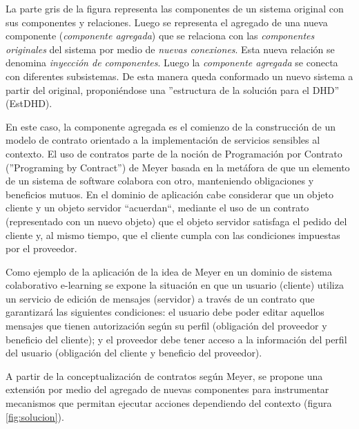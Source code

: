 La parte gris de la figura representa las componentes de un sistema original
con sus componentes y relaciones. Luego se representa el agregado de una nueva
componente (\textit{componente agregada}) que se relaciona con las
\textit{componentes originales} del sistema por medio de \textit{nuevas
conexiones}. Esta nueva relación se denomina \textit{inyección de componentes}.
Luego la \textit{componente agregada} se conecta con diferentes subsistemas. De
esta manera queda conformado un nuevo sistema a partir del
original, proponiéndose una ''estructura de la solución para
el DHD” (EstDHD).

En este caso, la componente agregada es el comienzo de la
construcción de un modelo de contrato orientado a la implementación de servicios
sensibles al contexto. El uso de contratos parte de la noción de Programación
por Contrato (”Programing by Contract”) de Meyer \cite{cap1.11} basada en la
metáfora de que un elemento de un sistema de software colabora con otro,
manteniendo obligaciones y beneficios mutuos. En el dominio de aplicación cabe
considerar que un objeto cliente y un objeto servidor “acuerdan“,  mediante el uso de 
un contrato (representado con un nuevo objeto) que el objeto servidor satisfaga
el pedido del cliente y, al mismo tiempo, que el cliente cumpla con las condiciones
impuestas por el proveedor.

Como ejemplo de la aplicación de la idea de Meyer en un dominio de
sistema colaborativo e-learning se expone la situación en que un
usuario (cliente) utiliza un servicio de edición de mensajes (servidor) a través
de un contrato que garantizará las siguientes condiciones: el usuario debe poder
editar aquellos mensajes que tienen autorización según su perfil (obligación del
proveedor y beneficio del cliente); y el proveedor debe tener acceso a la
información del perfil del usuario (obligación del cliente y beneficio del
proveedor).

A partir de la conceptualización de contratos según Meyer, se propone una
extensión por medio del agregado de nuevas componentes para instrumentar
mecanismos que permitan ejecutar acciones dependiendo del contexto (figura
\ref{fig:solucion}).

